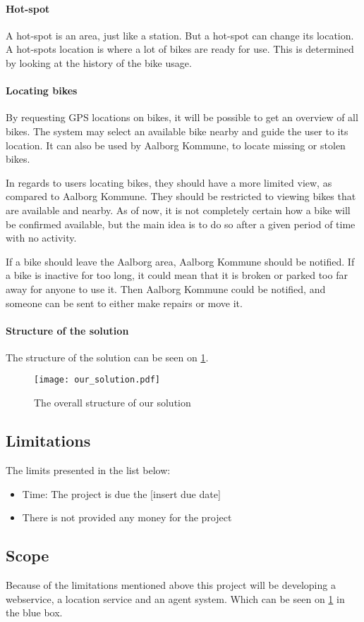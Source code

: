 \paragraph{Hot-spot}
A hot-spot is an area, just like a station.
But a hot-spot can change its location.
A hot-spots location is where a lot of bikes are ready for use.
This is determined by looking at the history of the bike usage.

\paragraph{Locating bikes}
By requesting GPS locations on bikes, it will be possible to get an overview of all bikes.
The system may select an available bike nearby and guide the user to its location.
It can also be used by Aalborg Kommune, to locate missing or stolen bikes.

In regards to users locating bikes, they should have a more limited view, as compared to Aalborg Kommune.
They should be restricted to viewing bikes that are available and nearby.
As of now, it is not completely certain how a bike will be confirmed available, but the main idea is to do so after a given period of time with no activity.

If a bike should leave the Aalborg area, Aalborg Kommune should be notified.
If a bike is inactive for too long, it could mean that it is broken or parked too far away for anyone to use it.
Then Aalborg Kommune could be notified, and someone can be sent to either make repairs or move it.

\paragraph{Structure of the solution}
The structure of the solution can be seen on \cref{fig:solution_structure}.

\begin{figure}
\texttt{[image: our\_solution.pdf]}
\caption{The overall structure of our solution}
\label{fig:solution_structure}
\end{figure}

\subsection{Limitations}
The limits presented in the list below:
\begin{itemize}
\item Time: The project is due the [insert due date]
\item There is not provided any money for the project
\end{itemize}

\subsection{Scope}
Because of the limitations mentioned above this project will be developing a webservice, a location service and an agent system.
Which can be seen on \cref{fig:solution_structure} in the blue box.

